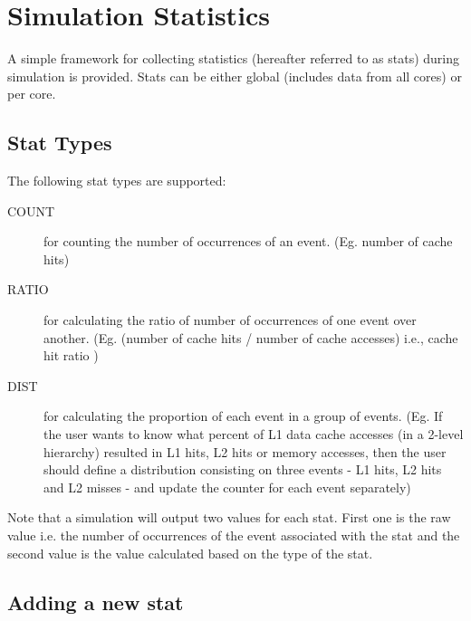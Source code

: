 

\chapter{Simulation Statistics}
\label{sec:stat}

A simple framework for collecting statistics (hereafter referred to as stats)
during simulation is provided.  Stats can be either global (includes
data from all cores) or per core.

\section{Stat Types}

The following stat types are supported:

\begin{description}

  \item [COUNT] for counting the number of occurrences of an event. (Eg. number
  of cache hits)

  \item [RATIO] for calculating the ratio of number of occurrences of one event
  over another. (Eg. (number of cache hits / number of cache accesses) i.e.,
  cache hit ratio )

  \item [DIST]  for calculating the proportion of each event in a group of
  events. (Eg. If the user wants to know what percent of L1 data cache accesses 
  (in a 2-level hierarchy) resulted in L1 hits, L2 hits or memory accesses, then the
  user should define a distribution consisting on three events - L1 hits,
  L2 hits and L2 misses  - and update the
 counter for each event separately) 

\end{description}

Note that a simulation will output two values for each stat. First one is the
raw value i.e. the number of occurrences of the event associated with the
stat and the second value is the value calculated based on the type
of the stat.


\section{Adding a new stat}

